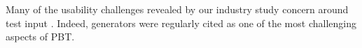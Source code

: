 



Many of the usability challenges revealed by our industry study concern
around test input
.
Indeed, generators were regularly cited as one of the most challenging
aspects of PBT.

